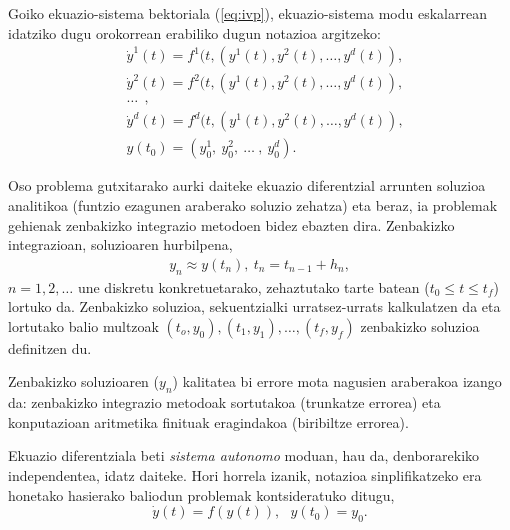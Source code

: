 Goiko ekuazio-sistema bektoriala (\ref{eq:ivp}), ekuazio-sistema modu eskalarrean idatziko dugu orokorrean erabiliko dugun notazioa argitzeko:
\begin{align*}
&\dot{y}^1(t)=f^1(t,(y^1(t),y^2(t),\ldots,y^d(t)), \\
&\dot{y}^2(t)=f^2(t,(y^1(t),y^2(t),\ldots,y^d(t)), \\
&\ldots\ \ ,\\
&\dot{y}^d(t)=f^d(t,(y^1(t),y^2(t),\ldots,y^d(t)),  \\
& y(t_0)=(y_{0}^1,\ y_{0}^2,\ \ldots \ , \ y_{0}^d).
\end{align*}


Oso problema gutxitarako aurki daiteke ekuazio diferentzial arrunten soluzioa analitikoa (funtzio ezagunen araberako soluzio zehatza) eta beraz, ia problemak gehienak zenbakizko integrazio metodoen bidez ebazten dira.
Zenbakizko integrazioan, soluzioaren hurbilpena,
\begin{align*}
 y_n \approx y(t_n), \ t_n=t_{n-1}+h_n, 
\end{align*}
$n=1,2,\dots$ une diskretu konkretuetarako, zehaztutako tarte batean ($t_0\le t \le t_f$) lortuko da. Zenbakizko soluzioa, sekuentzialki urratsez-urrats kalkulatzen da eta lortutako balio  multzoak $(t_o,y_0),(t_1,y_1),\dots,(t_f,y_f)$ zenbakizko soluzioa definitzen du.   

Zenbakizko soluzioaren ($y_n$) kalitatea bi errore mota nagusien araberakoa izango da: zenbakizko integrazio metodoak sortutakoa (trunkatze errorea) eta konputazioan aritmetika finituak eragindakoa (biribiltze errorea). 

Ekuazio diferentziala beti \emph{sistema autonomo} moduan, hau da, denborarekiko independentea, idatz daiteke. Hori horrela izanik, notazioa sinplifikatzeko era honetako hasierako baliodun problemak kontsideratuko ditugu,   
\begin{equation}
\label{eq:autonomo}
\dot{y}(t)=f(y(t)),\ \ \ y(t_0)=y_0.
\end{equation}

